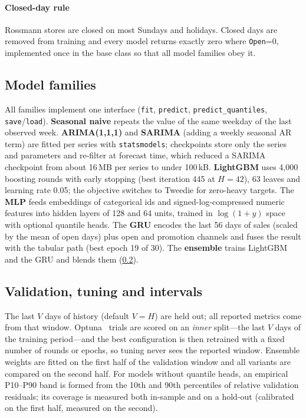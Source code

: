 \documentclass[conference]{IEEEtran}
\newcommand{\code}[1]{\texttt{\small #1}}
\begin{document}
\paragraph*{Closed-day rule}
Rossmann stores are closed on most Sundays and holidays. Closed days are removed from training and
every model returns exactly zero where \code{Open}=0, implemented once in the base class so that all
model families obey it.

\subsection{Model families}\label{sec:models}
All families implement one interface (\code{fit}, \code{predict}, \code{predict\_quantiles},
\code{save}/\code{load}).
\textbf{Seasonal naive} repeats the value of the same weekday of the last observed week.
\textbf{ARIMA(1,1,1)} and \textbf{SARIMA} (adding a weekly seasonal AR term) are fitted per series
with \code{statsmodels}; checkpoints store only the series and parameters and re-filter at forecast
time, which reduced a SARIMA checkpoint from about 16\,MB per series to under 100\,kB.
\textbf{LightGBM} uses 4,000 boosting rounds with early stopping (best iteration 445 at
$H{=}42$), 63 leaves and learning rate 0.05; the objective switches to Tweedie for zero-heavy
targets. The \textbf{MLP} feeds embeddings of categorical ids and signed-log-compressed numeric
features into hidden layers of 128 and 64 units, trained in $\log(1{+}y)$ space with optional
quantile heads. The \textbf{GRU} encodes the last 56 days of sales (scaled by the mean of open days)
plus open and promotion channels and fuses the result with the tabular path (best epoch 19 of 30).
The \textbf{ensemble} trains LightGBM and the GRU and blends them (\cref{sec:validation}).

\subsection{Validation, tuning and intervals}\label{sec:validation}
The last $V$ days of history (default $V=H$) are held out; all reported metrics come from that
window. Optuna~\cite{akiba2019optuna} trials are scored on an \emph{inner} split---the last $V$ days
of the training period---and the best configuration is then retrained with a fixed number of rounds
or epochs, so tuning never sees the reported window. Ensemble weights are fitted on the first half
of the validation window and all variants are compared on the second half. For models without
quantile heads, an empirical P10--P90 band is formed from the 10th and 90th percentiles of relative
validation residuals; its coverage is measured both in-sample and on a hold-out (calibrated on the
first half, measured on the second).
\end{document}
